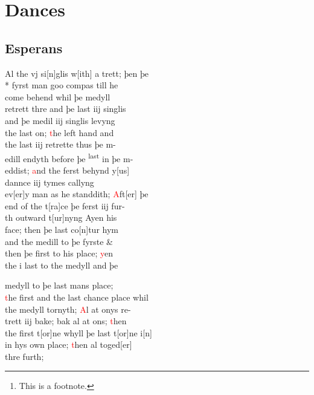 \documentclass[12pt,letter]{article} %
\newcommand{\red}[1]{\textcolor{red}{#1}}
\newcommand{\srcpg}[1]{
    \noindent{
        \color{Gray}{\rule[0.5ex]{\linewidth}{1pt}~#1} 
    
    }
}
\begin{document}
    \title{\rmfamily\normalfont{}}
    \author{}
    \date{} %
    
    \maketitle
    
    \begin{abstract}
        \noindent\lipsum[1] Just a test.\footnote{This is a footnote.}
    \end{abstract}
       
    \tableofcontents
\newpage

    \section{Dances}
    \reversemarginpar
    \subsection{Esperans} \raggedright 
\srcpg{54}    
 Al the vj si{[}n{]}glis w{[}ith{]} a trett; þen þe \\* 
fyrst man goo compas till he \\ 
come behend whil þe medyll \\ 
retrett thre and þe last iij singlis \\ 
and þe medil iij singlis levyng\\ 
the last on; \red{t}he left hand and \\
the last iij retrette thus þe m-\\
edill endyth before þe \textsuperscript{last} in þe m-\\
eddist; \red{a}nd the ferst behynd y{[}us{]} \\ 
dannce iij tymes callyng\\ 
ev{[}er{]}y man as he standdith; \red{A}ft{[}er{]} þe\\
end of the t{[}ra{]}ce þe ferst iij fur-\\
th outward t{[}ur{]}nyng Ayen his \\ 
face; then þe  last co{[}n{]}tur hym \\ 
and the medill to þe fyrste \& \\
then þe first to his place; \red{y}en \\ 
the i last to the medyll and þe  
\srcpg{55}
medyll to þe last mans  place; \\ 
\red{t}he first and the last chance place whil \\ 
the medyll tornyth; \red{A}l at onys re-\\
trett iij bake; bak al  at ons; \red{t}hen \\ 
the first t{[}or{]}ne whyll þe last t{[}or{]}ne i{[}n{]} \\ 
in hys own place; \red{t}hen al toged{[}er{]}\\ 
thre furth;
\end{document}
